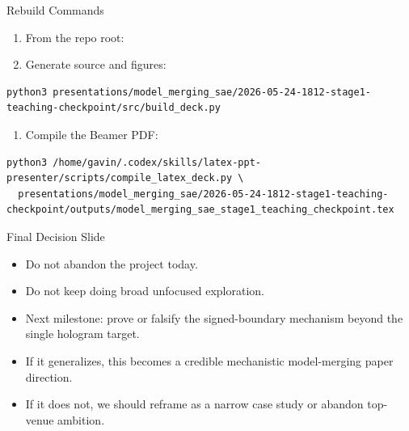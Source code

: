\documentclass[aspectratio=169]{beamer}
\begin{document}
\begin{frame}[fragile]{Rebuild Commands}
\scriptsize
\begin{enumerate}
  \item From the repo root: 
  \item Generate source and figures:
\end{enumerate}
\begin{verbatim}
python3 presentations/model_merging_sae/2026-05-24-1812-stage1-teaching-checkpoint/src/build_deck.py
\end{verbatim}
\begin{enumerate}
  \item Compile the Beamer PDF:
\end{enumerate}
\begin{verbatim}
python3 /home/gavin/.codex/skills/latex-ppt-presenter/scripts/compile_latex_deck.py \
  presentations/model_merging_sae/2026-05-24-1812-stage1-teaching-checkpoint/outputs/model_merging_sae_stage1_teaching_checkpoint.tex
\end{verbatim}

\end{frame}

\begin{frame}{Final Decision Slide}
\small
\begin{itemize}
  \item Do not abandon the project today.
  \item Do not keep doing broad unfocused exploration.
  \item Next milestone: prove or falsify the signed-boundary mechanism beyond the single hologram target.
  \item If it generalizes, this becomes a credible mechanistic model-merging paper direction.
  \item If it does not, we should reframe as a narrow case study or abandon top-venue ambition.
\end{itemize}
\end{frame}
\end{document}
